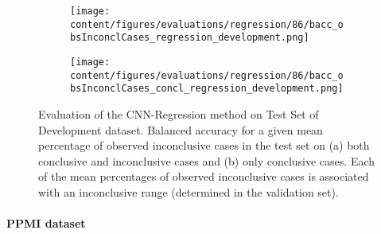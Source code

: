 \begin{figure}[ht]
  \begin{subfigure}{0.9\textwidth}
    \centering
    \texttt{[image: content/figures/evaluations/regression/86/bacc\_obsInconclCases\_regression\_development.png]}
    \subcaption{}
    \label{fig:bacc_obsInconclCases_regression_development}
  \end{subfigure}
  \hfill
  \begin{subfigure}{0.9\textwidth}
    \centering
    \texttt{[image: content/figures/evaluations/regression/86/bacc\_obsInconclCases\_concl\_regression\_development.png]}
    \subcaption{}
    \label{fig:bacc_obsInconclCases_concl_regression_development}
  \end{subfigure}

  \caption{Evaluation of the CNN-Regression method on Test Set of Development dataset.
  Balanced accuracy for a given mean percentage of observed inconclusive cases in the test set on 
  (a) both conclusive and inconclusive cases and (b) only conclusive cases. 
  Each of the mean percentages of observed inconclusive cases is associated with an inconclusive range (determined in the validation set). }
  \label{fig:bacc_obsInconclCases_regression_development_full}
\end{figure}




\paragraph{PPMI dataset}

